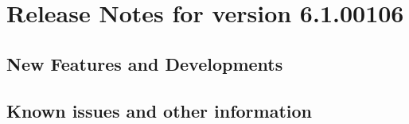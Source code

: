 
\section{Release Notes for \app{} version 6.1.00106}

\subsection{New Features and Developments}


\subsection{Known issues and other information}

